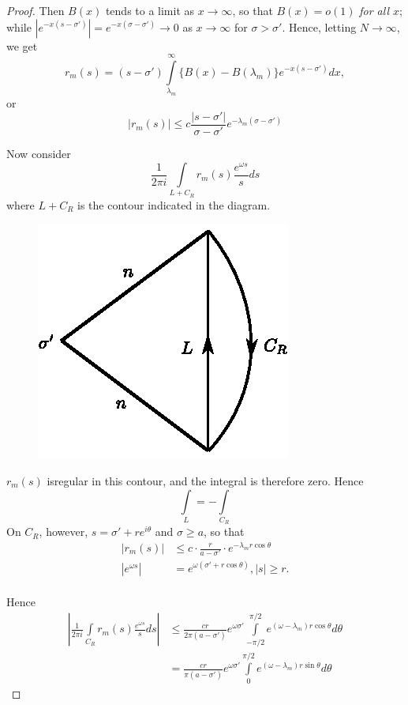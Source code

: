\begin{proof}
Then $B(x)$ tends to a limit as $x \to \infty$, so that 
$B(x) = o(1)$ \textit{for all $x$}; while $|e^{-x(s-\sigma')}| =
e^{-x(\sigma-\sigma')} \to 0$ as $x \to \infty$ for $\sigma >
\sigma'$. Hence, letting $N \to \infty$, we get
$$
r_m (s) = (s-\sigma') \int\limits^\infty_{\lambda_m} \{B(x) -
B(\lambda_m)\} e^{-x(s-\sigma')} dx,
$$
or
$$
|r_m(s)| \leq c \frac{|s-\sigma'|}{\sigma-\sigma'}
e^{-\lambda_m(\sigma-\sigma')} 
$$

Now consider
$$
\frac{1}{2\pi i} \int\limits_{L+C_R} r_m(s) \frac{e^{\omega s}}{s} ds
$$
where $L+C_R$ is the contour indicated in the diagram.
\begin{figure}[H]
\centering
\includegraphics{figures/fig2.eps}
\end{figure}

$r_m(s)$ is\pageoriginale regular in this contour, and the integral is
therefore zero. Hence
$$
\int\limits_L = -\int\limits_{C_R}
$$
On $C_R$, however, $s = \sigma'+ re^{i\theta}$ and $\sigma \geq a$, so
that 
\begin{align*}
|r_m(s)| & \leq c \cdot \frac{r}{a-\sigma'} \cdot e^{-\lambda_m r
  \cos\theta} \\
|e^{\omega s}| & = e^{\omega(\sigma'+r\cos \theta)}, |s| \geq r.\\
\end{align*}

Hence
\begin{align*}
\left|\frac{1}{2\pi i} \int\limits_{C_R} r_m(s) \frac{e^{\omega s}}{s}
ds\right| & \leq \frac{cr}{2\pi (a-\sigma')} e^{\omega \sigma'}
\int\limits^{\pi/2}_{-\pi/2}  e^{(\omega-\lambda_m) r\cos \theta} d
\theta\\
& = \frac{cr}{\pi (a-\sigma')} e^{\omega \sigma'}
\int\limits^{\pi/2}_0 e^{(\omega -\lambda_m) r \sin \theta} d \theta
\end{align*}


\end{proof}
